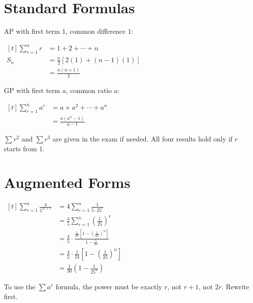 \documentclass[a4paper,11pt,oneside]{book}
\providecommand{\cdisp}[1]{\par\noindent$\displaystyle\begin{aligned}[t]#1\end{aligned}$\par\smallskip}
\renewcommand{\cdisp}[1]{\par\noindent\hfill$\displaystyle\begin{aligned}[t]#1\end{aligned}$\hfill\null\par\smallskip}
\begin{document}
\section{Standard Formulas}
\noindent\begin{minipage}[t]{0.48\textwidth}
{\color{gray}AP with first term $1$, common difference $1$:
\cdisp{\sum_{r=1}^{n}r&=1+2+\cdots+n\\S_n&=\frac{n}{2}\left[2(1)+(n-1)(1)\right]\\&=\frac{n(n+1)}{2}}}
\end{minipage}\hfill\begin{minipage}[t]{0.48\textwidth}
{\color{gray}GP with first term $a$, common ratio $a$:
\cdisp{\sum_{r=1}^{n}a^{r}&=a+a^{2}+\cdots+a^{n}\\&=\frac{a\left(a^{n}-1\right)}{a-1}}}
\end{minipage}\par
\noindent\begin{minipage}[t]{0.48\textwidth}
\end{minipage}\hfill\begin{minipage}[t]{0.48\textwidth}
\end{minipage}\par
\begin{info}[title=Note]
$\sum r^{2}$ and $\sum r^{3}$ are given in the exam if needed. All four results hold only if $r$ starts from $1$.
\end{info}
\section{Augmented Forms}
\exlab
\cdisp{\sum_{r=1}^{n}\frac{4}{5^{2r+1}}&=4\sum_{r=1}^{n}\frac{1}{5\cdot25^{r}}\\&=\frac45\sum_{r=1}^{n}\left(\frac{1}{25}\right)^{r}\\&=\frac45\cdot\frac{\frac{1}{25}\left[1-\left(\frac{1}{25}\right)^{n}\right]}{1-\frac{1}{25}}\\&=\frac45\cdot\frac{1}{24}\left[1-\left(\frac{1}{25}\right)^{n}\right]\\&=\frac{1}{30}\left(1-\frac{1}{25^{n}}\right)}
\begin{info}[title=Note]
To use the $\sum a^{r}$ formula, the power must be exactly $r$, not $r+1$, not $2r$. Rewrite first.
\end{info}
\clearpage
\end{document}
